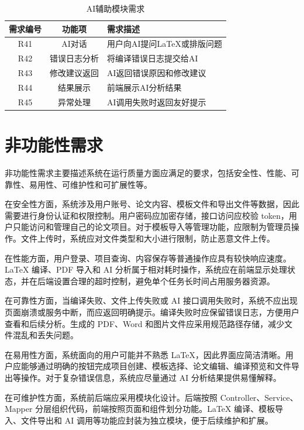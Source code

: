 \documentclass{xduugthesis}
\begin{document}
\begin{table}[!ht]
    \centering
    \caption{AI辅助模块需求}
    \label{tab:ai-requirement}
    \begin{tabular}{|c|c|p{7cm}|}
        \hline
        需求编号 & 功能项 & 需求描述 \\
        \hline
        R41 & AI对话 & 用户向AI提问LaTeX或排版问题 \\
        \hline
        R42 & 错误日志分析 & 将编译错误日志提交给AI \\
        \hline
        R43 & 修改建议返回 & AI返回错误原因和修改建议 \\
        \hline
        R44 & 结果展示 & 前端展示AI分析结果 \\
        \hline
        R45 & 异常处理 & AI调用失败时返回友好提示 \\
        \hline
    \end{tabular}
\end{table}

\section{非功能性需求}
非功能性需求主要描述系统在运行质量方面应满足的要求，包括安全性、性能、可靠性、易用性、可维护性和可扩展性等。

在安全性方面，系统涉及用户账号、论文内容、模板文件和导出文件等数据，因此需要进行身份认证和权限控制。用户密码应加密存储，接口访问应校验 token，用户只能访问和管理自己的论文项目。对于模板导入等管理功能，应限制为管理员操作。文件上传时，系统应对文件类型和大小进行限制，防止恶意文件上传。

在性能方面，用户登录、项目查询、内容保存等普通操作应具有较快响应速度。LaTeX 编译、PDF 导入和 AI 分析属于相对耗时操作，系统应在前端显示处理状态，并在后端设置合理的超时控制，避免单个任务长时间占用服务器资源。

在可靠性方面，当编译失败、文件上传失败或 AI 接口调用失败时，系统不应出现页面崩溃或服务中断，而应返回明确提示。编译失败时应保留错误日志，方便用户查看和后续分析。生成的 PDF、Word 和图片文件应采用规范路径存储，减少文件混乱和丢失问题。

在易用性方面，系统面向的用户可能并不熟悉 LaTeX，因此界面应简洁清晰。用户应能够通过明确的按钮完成项目创建、模板选择、论文编辑、编译预览和文件导出等操作。对于复杂错误信息，系统应尽量通过 AI 分析结果提供易懂解释。

在可维护性方面，系统前后端应采用模块化设计。后端按照 Controller、Service、Mapper 分层组织代码，前端按照页面和组件划分功能。LaTeX 编译、模板导入、文件导出和 AI 调用等功能应封装为独立模块，便于后续维护和扩展。
\end{document}
